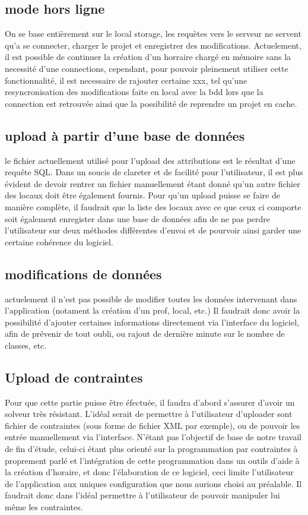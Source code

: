 \subsection{mode hors ligne}
On se base entièrement sur le local storage, les requètes vers le serveur ne
servent qu'a se connecter, charger le projet et enregistrer des modifications.
Actuelement, il est possible de continuer la création d'un horraire chargé en
mémoire sans la necessité d'une connections, cependant, pour pouvoir pleinement
utiliser cette fonctionnalité, il est necessaire de rajouter certaine xxx, tel
qu'une resyncronisation des modifications faite en local avec la bdd lors que la
connection est retrouvée ainsi que la possibilité de reprendre un projet en
cache.
\subsection{upload à partir d'une base de données}
le fichier actuellement utilisé pour l'upload des attributions est le résultat d'une requête SQL. Dans un soucis de clareter et de facilité pour l'utilisateur, il est plus évident de devoir rentrer un fichier manuellement étant donné qu'un autre fichier des locaux doit être également fournis. Pour qu'un upload puisse se faire de manière complète, il faudrait que la liste des locaux avec ce que ceux ci comporte soit également enregister dans une base de données afin de ne pas perdre l'utilisateur sur deux méthodes différentes d'envoi et de pourvoir ainsi garder une certaine cohérence du logiciel.
\subsection{modifications de données}
actuelement il n'est pas possible de modifier toutes les données intervenant
dans l'application (notament la création d'un prof, local, etc.) Il faudrait donc avoir la possibilité d'ajouter certaines informations directement via l'interface du logiciel, afin de prévenir de tout oubli, ou rajout de dernière minute sur le nombre de classes, etc.

\subsection{Upload de contraintes}
Pour que cette partie puisse être éfectuée, il faudra d'abord s'assurer d'avoir un solveur très résistant. L'idéal serait de permettre à l'utilisateur d'uploader sont fichier de contraintes (sous forme de fichier XML par exemple), ou de pouvoir les entrée manuellement via l'interface. N'étant pas l'objectif de base de notre travail de fin d'étude, celui-ci étant plus orienté sur la programmation par contraintes à proprement parlé et l'intégration de cette programmation dans un outils d'aide à la création d'horaire, et donc l'élaboration de ce logiciel, ceci limite l'utilisateur de l'application aux uniques configuration que nous aurions choisi au préalable. Il faudrait donc dans l'idéal permettre à l'utilisateur de pouvoir manipuler lui même les contraintes.
